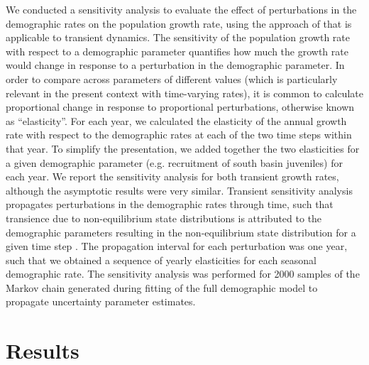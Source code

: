 \documentclass[11pt]{article}
\begin{document}
We conducted a sensitivity analysis to evaluate the effect of perturbations 
in the demographic rates on the population growth rate, 
using the approach of \cite{caswell2007sensitivity} 
that is applicable to transient dynamics. 
The sensitivity of the population growth rate with respect to a demographic parameter
quantifies how much the growth rate would change in response to a perturbation in the 
demographic parameter. 
In order to compare across parameters of different values 
(which is particularly relevant in the present context with time-varying rates),
it is common to calculate proportional change in  
response to proportional perturbations,
otherwise known as ``elasticity''.
For each year, we calculated the elasticity of the annual growth rate with respect
to the demographic rates at each of the two time steps within that year.
To simplify the presentation, 
we added together the two elasticities for a given demographic parameter 
(e.g. recruitment of south basin juveniles) for each year.
We report the sensitivity analysis for both transient growth rates,
although the asymptotic results were very similar.
Transient sensitivity analysis propagates perturbations in the demographic rates 
through time, 
such that transience due to non-equilibrium state distributions is attributed to the
demographic parameters resulting in the non-equilibrium state distribution 
for a given time step
\citep[][relevant equations are reproduced in Appendix III]{caswell2007sensitivity}.
The propagation interval for each perturbation was one year, 
such that we obtained a sequence of yearly elasticities 
for each seasonal demographic rate.
The sensitivity analysis was performed for 2000 samples of the Markov chain generated 
during fitting of the full demographic model to propagate uncertainty parameter estimates.






\section*{Results}
\end{document}
